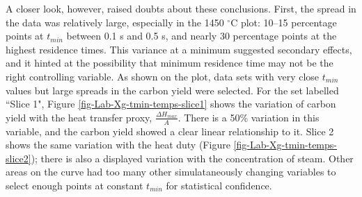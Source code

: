 \documentclass[11pt,twocolumn]{article}
\begin{document}
A closer look, however, raised doubts about these conclusions.  First, the spread in the data was relatively large, especially in the 1450 $^{\circ}$C plot: 10--15 percentage points at $t_{min}$ between 0.1 s and 0.5 s, and nearly 30 percentage points at the highest residence times.  This variance at a minimum suggested secondary effects, and it hinted at the possibility that minimum residence time may not be the right controlling variable.  As shown on the plot, data sets with very close $t_{min}$ values but large spreads in the carbon yield were selected.  For the set labelled ``Slice 1", Figure \ref{fig-Lab-Xg-tmin-temps-slice1} shows the variation of carbon yield with the heat transfer proxy, $\frac{\Delta H_{max}}{A}$.  There is a 50\% variation in this variable, and the carbon yield showed a clear linear relationship to it.  Slice 2 shows the same variation with the heat duty (Figure \ref{fig-Lab-Xg-tmin-temps-slice2}); there is also a displayed variation with the concentration of steam.  Other areas on the curve had too many other simulataneously changing variables to select enough points at constant $t_{min}$ for statistical confidence.
\end{document}
